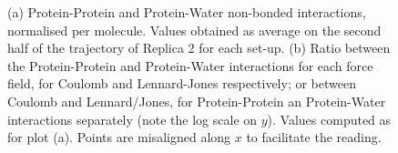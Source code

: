 \begin{figure}[h!]
\centering
\vspace{3cm}
\caption[Replica 2: Non-bonded protein energy contribution to capsule structures]{(a) Protein-Protein and Protein-Water non-bonded interactions, normalised per molecule. Values obtained as average on the second half of the trajectory of Replica 2 for each set-up. (b) Ratio between the Protein-Protein and Protein-Water interactions for each force field, for Coulomb and Lennard-Jones respectively; or between Coulomb and Lennard/Jones, for Protein-Protein an Protein-Water interactions separately (note the log scale on $y$). Values computed as for plot (a). Points are misaligned along $x$ to facilitate the reading.}
\label{fig:eng_cg2}
\vspace{3cm}
\end{figure}



